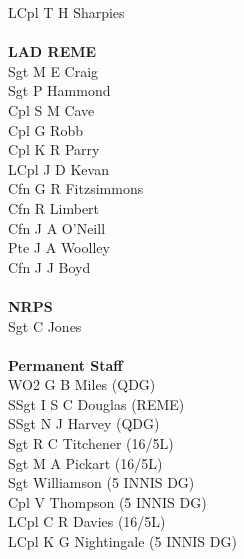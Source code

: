 \begin{multicols}{2}
  LCpl T H Sharpies \\
  \\
  \textbf{LAD REME} \\
  Sgt M E Craig \\
  Sgt P Hammond \\
  Cpl S M Cave \\
  Cpl G Robb \\
  Cpl K R Parry \\
  LCpl J D Kevan \\
  Cfn G R Fitzsimmons \\
  Cfn R Limbert \\
  Cfn J A O'Neill \\
  Pte J A Woolley \\
  Cfn J J Boyd \\
  \\
  \textbf{NRPS} \\
  Sgt C Jones \\
  \\
  \textbf{Permanent Staff} \\
  WO2 G B Miles (QDG) \\
  SSgt I S C Douglas (REME) \\
  SSgt N J Harvey (QDG) \\
  Sgt R C Titchener (16/5L) \\
  Sgt M A Pickart (16/5L) \\
  Sgt Williamson (5 INNIS DG) \\
  Cpl V Thompson (5 INNIS DG) \\
  LCpl C R Davies (16/5L) \\
  LCpl K G Nightingale (5 INNIS DG) \\
\end{multicols}
